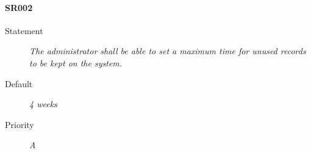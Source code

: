 \paragraph{SR002}
  \begin{description}
  \item [Statement] 
    \textit{ The administrator shall be able to set a maximum time for unused records to be kept on the system.}
  \item [Default] \textit{4 weeks}
  \item [Priority] \textit{A}
\end{description}
